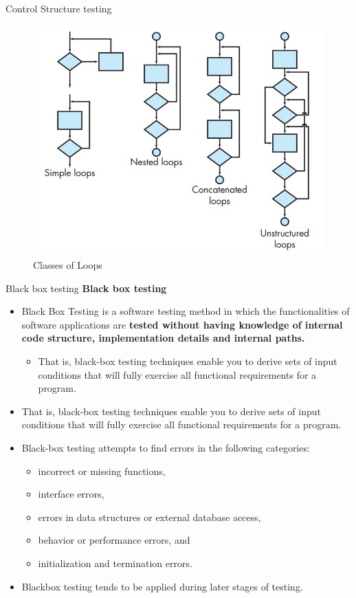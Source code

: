 \documentclass{beamer}
\begin{document}
\begin{frame}{Control Structure testing}
	\begin{figure}
		\includegraphics[scale=.4]{img/m3_26}
		\caption{Classes of Loops}
	\end{figure}
\end{frame}
\begin{frame}{Black box testing}
\textbf{Black box testing}
\begin{itemize}
	\item Black Box Testing is a software testing method in which the functionalities of software applications are\textbf{ tested without having knowledge of internal code structure, implementation details and internal paths. }
\begin{itemize}
	\item That is, black-box testing techniques enable you to derive sets of input conditions that will fully exercise all functional requirements for a program. 
\end{itemize}
	\item That is, black-box testing techniques enable you to derive sets of input conditions that will fully exercise all functional requirements for a program. 
	\item Black-box testing attempts to find errors in the following categories: 
	\begin{itemize}
		\item incorrect or missing functions, 
		\item interface errors, 
		\item errors in data structures or external database access, 
		\item behavior or performance errors, and 
		\item initialization and termination errors.
	\end{itemize}
\item Blackbox testing tends to be applied during later stages of testing.
\end{itemize}
\end{frame}
\end{document}
